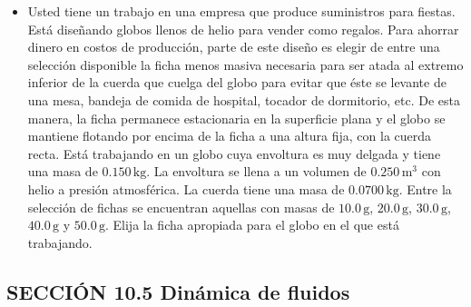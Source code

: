 \documentclass[11pt,a4paper]{article}
\begin{document}
\begin{itemize}
    \item[\textbf{19.}] Usted tiene un trabajo en una empresa que produce suministros para fiestas. Está diseñando globos llenos de helio para vender como regalos. Para ahorrar dinero en costos de producción, parte de este diseño es elegir de entre una selección disponible la ficha menos masiva necesaria para ser atada al extremo inferior de la cuerda que cuelga del globo para evitar que éste se levante de una mesa, bandeja de comida de hospital, tocador de dormitorio, etc. De esta manera, la ficha permanece estacionaria en la superficie plana y el globo se mantiene flotando por encima de la ficha a una altura fija, con la cuerda recta. Está trabajando en un globo cuya envoltura es muy delgada y tiene una masa de \(0.150\,\text{kg}\). La envoltura se llena a un volumen de \(0.250\,\text{m}^3\) con helio a presión atmosférica. La cuerda tiene una masa de \(0.0700\,\text{kg}\). Entre la selección de fichas se encuentran aquellas con masas de \(10.0\,\text{g}\), \(20.0\,\text{g}\), \(30.0\,\text{g}\), \(40.0\,\text{g}\) y \(50.0\,\text{g}\). Elija la ficha apropiada para el globo en el que está trabajando.
    \vspace*{7cm}
\end{itemize}

\newpage

\subsection*{SECCIÓN 10.5 Dinámica de fluidos}
\end{document}
